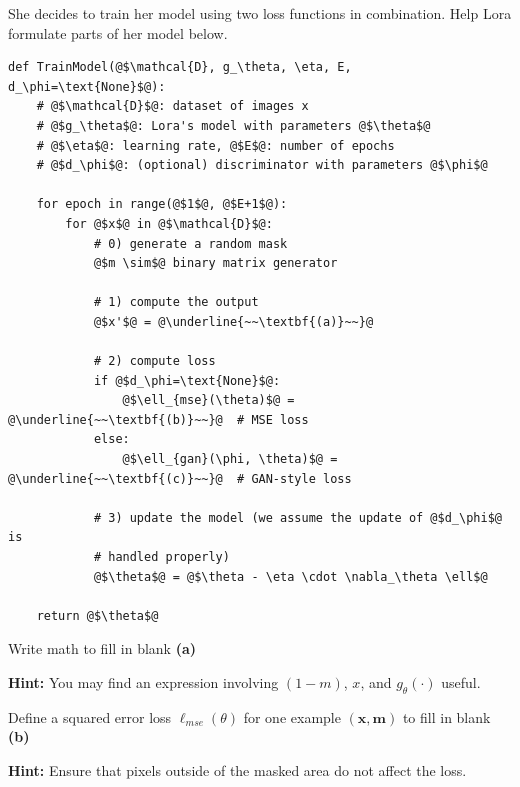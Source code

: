 \documentclass[11pt,addpoints,answers]{exam}
\newcommand{\mv}{\mathbf{m}}
\newcommand{\xv}{\mathbf{x}}
\begin{document}
\begin{questions}
\begin{parts}
She decides to train her model using two loss functions in combination. Help Lora formulate parts of her model below.

\begin{lstlisting}[escapechar=@]
def TrainModel(@$\mathcal{D}, g_\theta, \eta, E, d_\phi=\text{None}$@):
    # @$\mathcal{D}$@: dataset of images x
    # @$g_\theta$@: Lora's model with parameters @$\theta$@
    # @$\eta$@: learning rate, @$E$@: number of epochs
    # @$d_\phi$@: (optional) discriminator with parameters @$\phi$@
    
    for epoch in range(@$1$@, @$E+1$@):
        for @$x$@ in @$\mathcal{D}$@:
            # 0) generate a random mask
            @$m \sim$@ binary matrix generator
            
            # 1) compute the output
            @$x'$@ = @\underline{~~\textbf{(a)}~~}@
            
            # 2) compute loss
            if @$d_\phi=\text{None}$@: 
                @$\ell_{mse}(\theta)$@ = @\underline{~~\textbf{(b)}~~}@  # MSE loss 
            else: 
                @$\ell_{gan}(\phi, \theta)$@ = @\underline{~~\textbf{(c)}~~}@  # GAN-style loss
            
            # 3) update the model (we assume the update of @$d_\phi$@ is 
            # handled properly)
            @$\theta$@ = @$\theta - \eta \cdot \nabla_\theta \ell$@
            
    return @$\theta$@
\end{lstlisting}



\begin{subparts}

\subpart[1] Write math to fill in blank \textbf{(a)}

\textbf{Hint:} You may find an expression involving \( (1 - m) \), \( x \), and \( g_\theta(\cdot) \) useful.

\label{subpart:gan-question-a}
    \begin{answer_box}[title=,height=2cm, width=14cm]
    \end{answer_box}

\subpart[1] Define a squared error loss $\ell_{mse}(\theta)$ for one example $(\xv, \mv)$ to fill in blank \textbf{(b)}

\textbf{Hint:} Ensure that pixels outside of the masked area do not affect the loss.

    \begin{answer_box}[title=,height=2cm, width=14cm]
    \end{answer_box}
    

\end{subparts}
\end{parts}
\end{questions}
\end{document}
